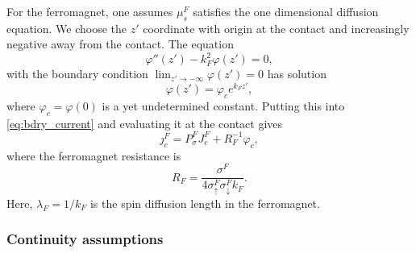 For the ferromagnet, one assumes $μ_s^F$ satisfies
the one dimensional diffusion equation.
We choose the $z'$ coordinate with origin at the contact
and increasingly negative away from the contact.
The equation
\begin{equation}
  \label{eq:diffusion.ferromagnet}
  φ'' \left( z' \right) - k_F^2 φ \left( z' \right) = 0 ,
\end{equation}
with the boundary condition
$\lim_{z' → - ∞} φ(z') = 0$
has solution
\begin{equation}
  \label{eq:diffusion.ferromagnet.solution}
  φ(z') = φ_c e^{k_F z'} ,
\end{equation}
where $φ_c = φ(0)$ is a yet undetermined constant.
Putting this into \cref{eq:bdry_current} and evaluating it at the contact gives
\begin{equation}
  \label{eq:bdry_current.ferromagnet}
  ȷ^F_c = P_σ^F J^F_c + R_F^{-1} φ_c ,
\end{equation}
where the ferromagnet resistance is
\begin{equation}
  R_F = \frac{σ^F}{ 4 σ_↑^F σ_↓^F k_F } .
\end{equation}
Here, $λ_F = 1 / k_F$ is the spin diffusion length in the ferromagnet.

\subsubsection{Continuity assumptions}

